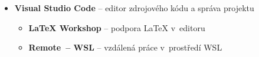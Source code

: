 \newcommand*{\swsubitems}[1]{%
  \begin{itemize}[%
    label={\textendash},%
    leftmargin=1.5em,%
    itemsep=0.5\baselineskip,%
    parsep=0pt,%
    topsep=3pt,%
    partopsep=0pt,%
    after=\vspace{-0.5\baselineskip}]%
  #1%
  \end{itemize}}

\begin{itemize}[%
  label={},%
  leftmargin=0pt,%
  labelsep=0pt,%
  itemsep=0.5\baselineskip,%
  parsep=0pt,%
  topsep=0pt,%
  partopsep=0pt]

  \item \textbf{Visual Studio Code} -- editor zdrojového kódu a správa projektu
  \swsubitems{%
    \item \textbf{LaTeX Workshop} -- podpora LaTeX v~editoru
    \item \textbf{Remote~-- WSL} -- vzdálená práce v~prostředí WSL
  }


\end{itemize}
